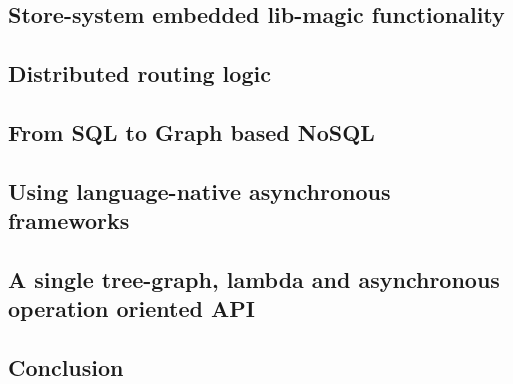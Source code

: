 \subsection{Store-system embedded lib-magic functionality}
\subsection{Distributed routing logic}
\subsection{From SQL to Graph based NoSQL}
\subsection{Using language-native asynchronous frameworks}
\subsection{A single tree-graph, lambda and asynchronous operation oriented API}
\subsection{Conclusion}
